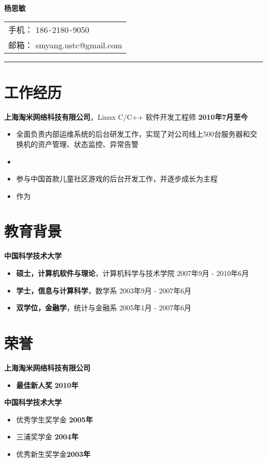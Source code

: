 \documentclass[margin]{res}
\newcommand{\ustc}{中国科学技术大学}
\newcommand{\taomee}{上海淘米网络科技有限公司}
\begin{document}
{\bfseries \huge 杨思敏}
\hfill
\begin{tabular}{l}
    手机： 186\texttt{-}2180\texttt{-}9050\\
    邮箱： {smyang.ustc@gmail.com}
\end{tabular}
\rule{\columnwidth}{1pt}

\section{工作经历}
{\bf \taomee}，Linux C/C++ 软件开发工程师 \hfill {\bf 2010年7月至今}\\[1mm]
\begin{itemize}
    \item 全面负责内部运维系统的后台研发工作，实现了对公司线上500台服务器和交换机的资产管理、状态监控、异常告警
    \item 
    \item 参与中国首款儿童社区游戏的后台开发工作，并逐步成长为主程
    \item 作为

\end{itemize}

\section{教育背景}
{\bf \ustc}\\[1mm]
\begin{itemize}
    \item {\bf 硕士，计算机软件与理论}，计算机科学与技术学院 \hfill 2007年9月 - 2010年6月
    \item {\bf 学士，信息与计算科学}，数学系 \hfill 2003年9月 - 2007年6月
    \item {\bf 双学位，金融学}，统计与金融系 \hfill 2005年1月 - 2007年6月
\end{itemize}


\section{荣誉} 
{\bf \taomee}\\
\begin{itemize}
    \item {\bf 最佳新人奖} \hfill {\bf 2010年}
\end{itemize}
{\bf \ustc}\\
\begin{itemize}
    \item 优秀学生奖学金 \hfill {\bf 2005年}
    \item 三浦奖学金 \hfill {\bf 2004年}
    \item 优秀新生奖学金\hfill {\bf 2003年}
\end{itemize}
\end{document}
